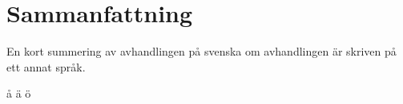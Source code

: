 



\chapter{Sammanfattning}

En kort summering av avhandlingen p\r{a} svenska om avhandlingen \"ar skriven p\r{a}  ett annat spr\r{a}k.

\r{a} \"a \"o






